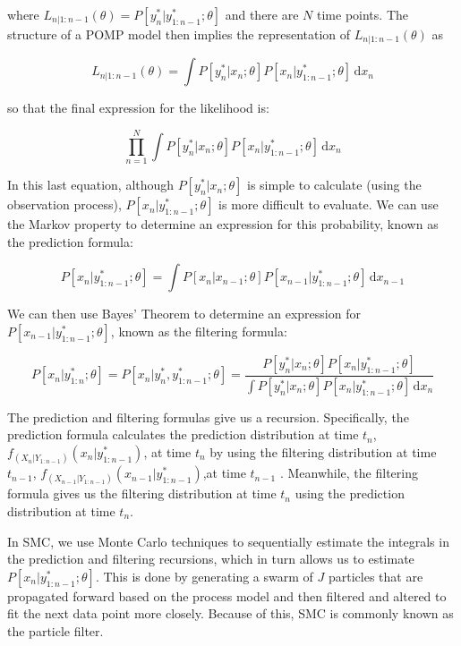 \documentclass{article}
\begin{document}
where $L_{n|1:n-1}(\theta)=P[y_n^*|y_{1:n-1}^*;\theta]$ and there are $N$ time points. The structure of a POMP model then implies the representation of $L_{n|1:n-1}(\theta)$ as

\begin{equation}
L_{n|1:n-1}(\theta)=\int \! P[y_n^*|x_n;\theta]P[x_n|y_{1:n-1}^*;\theta] \, \mathrm{d}x_n
\end{equation}

so that the final expression for the likelihood is: 

\begin{equation}
\prod\limits_{n=1}^N \int \! P[y_n^*|x_n;\theta]P[x_n|y_{1:n-1}^*;\theta] \, \mathrm{d}x_n
\end{equation}

In this last equation, although $P[y_n^*|x_n;\theta]$ is simple to calculate (using the observation process), $P[x_n|y_{1:n-1}^*;\theta]$ is more difficult to evaluate. We can use the Markov property to determine an expression for this probability, known as the prediction formula: 

\begin{equation}
P[x_n|y_{1:n-1}^*;\theta]=\int \! P[x_n|x_{n-1};\theta]P[x_{n-1}|y_{1:n-1}^*;\theta] \, \mathrm{d}x_{n-1}
\end{equation}

We can then use Bayes’ Theorem to determine an expression for $P[x_{n-1}|y_{1:n-1}^*;\theta]$, known as the filtering formula: 

\begin{equation}
P[x_n|y_{1:n}^*;\theta]=P[x_n|y_n^*,y_{1:n-1}^*;\theta]=\frac{P[y_n^*|x_n;\theta]P[x_n|y_{1:n-1}^*;\theta]}{\int \! P[y_n^*|x_n;\theta]P[x_n|y_{1:n-1}^*;\theta] \, \mathrm{d}x_n}
\end{equation}

The prediction and filtering formulas give us a recursion. Specifically, the prediction formula calculates the prediction distribution at time $t_n$, $f_(X_n|Y_{1:n-1})(x_n|y_{1:n-1}^*)$, at time $t_n$ by using the filtering distribution at time $t_{n-1}$, $f_(X_{n-1}|Y_{1:n-1})(x_{n-1}|y_{1:n-1}^*)$,at time $t_{n-1}$ . Meanwhile, the filtering formula gives us the filtering distribution at time $t_n$ using the prediction distribution at time $t_n$. 

In SMC, we use Monte Carlo techniques to sequentially estimate the integrals in the prediction and filtering recursions, which in turn allows us to estimate $P[x_n|y_{1:n-1}^*;\theta]$. This is done by generating a swarm of $J$ particles that are propagated forward based on the process model and then filtered and altered to fit the next data point more closely. Because of this, SMC is commonly known as the particle filter.
\end{document}
